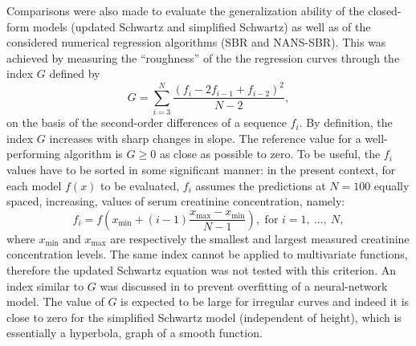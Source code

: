 \documentclass[10pt,final]{siamltex}
\begin{document}
Comparisons were also made to evaluate the generalization ability of the closed-form models (updated Schwartz and simplified Schwartz) as well as of the considered numerical regression algorithms (SBR and NANS-SBR). This was achieved by measuring the ``roughness'' of the the regression curves through the index $G$ defined by
%
\begin{equation}
  G = \sum_{i=3}^{N}{\frac{(f_i-2f_{i-1}+f_{i-2})^2}{N-2}},
\end{equation}
%
on the basis of the second-order differences of a sequence $f_i$. By definition, the index $\textit{G}$ increases with sharp changes in slope. The reference value for a well-performing algorithm is $G\geq 0$ as close as possible to zero. To be useful, the $f_i$ values have to be sorted in some significant manner: in the present context, for each model $f(x)$ to be evaluated, $f_i$ assumes the predictions at $N = 100$ equally spaced, increasing, values of serum creatinine concentration, namely:
%
\begin{equation}\label{eqn_sampl}
  f_i = f\left(x_\mathrm{min} + (i-1)\frac{x_\mathrm{max}-x_\mathrm{min}}{N-1}\right), \text{ for } i = 1,\ \ldots,\ N,
\end{equation}
%
where $x_\mathrm{min}$ and $x_\mathrm{max}$ are respectively the smallest and largest measured creatinine concentration levels. The same index cannot be applied to multivariate functions, therefore the updated Schwartz equation was not tested with this criterion.
%
%
An index similar to $\mathit{G}$ was discussed in \cite{bishop} to prevent overfitting of a neural-network model.
The value of $G$ is expected to be large for irregular curves and indeed it is close to zero for the simplified Schwartz model (independent of height), which is essentially a hyperbola, graph of a smooth function.
%
\end{document}
